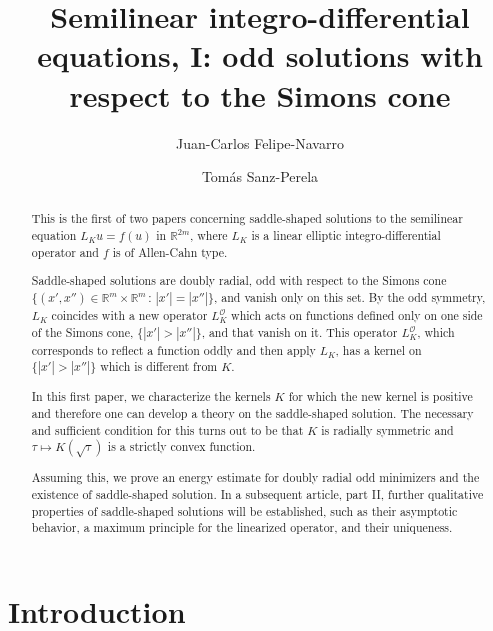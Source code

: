 \documentclass[12pt,reqno]{amsart}
\title[Semilinear integro-differential equations I]{Semilinear integro-differential equations, I: odd solutions with respect to the Simons cone}
\author{Juan-Carlos Felipe-Navarro}
\author{Tomás Sanz-Perela}
\theoremstyle{definition}
\theoremstyle{remark}
\newcommand{\con}[1]{\mathbb{#1}}
\newcommand{\R}{\con{R}} %
\newcommand{\ocal}{\mathcal{O}}
\numberwithin{equation}{section}
\begin{document}
\begin{abstract}
This is the first of two papers concerning saddle-shaped solutions to the semilinear equation $L_K u = f(u)$ in $\R^{2m}$, where $L_K$ is a linear elliptic integro-differential operator and $f$ is of Allen-Cahn type. 

Saddle-shaped solutions are doubly radial, odd with respect to the Simons cone $\{(x', x'') \in \R^m \times \R^m \, : \, |x'| = |x''|\}$, and vanish only on this set. By the odd symmetry, $L_K$ coincides with a new operator $L_K^\ocal$ which acts on functions defined only on one side of the Simons cone, $\{|x'|>|x''|\}$, and that vanish on it. This operator $L_K^\ocal$, which corresponds to reflect a function oddly and then apply $L_K$, has a kernel on $\{|x'|>|x''|\}$ which is different from $K$. 

In this first paper, we characterize the kernels $K$ for which the new kernel is positive and therefore one can develop a theory on the saddle-shaped solution. The necessary and sufficient condition for this turns out to be that $K$ is radially symmetric and $\tau\mapsto K(\sqrt \tau)$ is a strictly convex function. 

Assuming this, we prove an energy estimate for doubly radial odd minimizers and the existence of saddle-shaped solution. In a subsequent article, part II, further qualitative properties of saddle-shaped solutions will be established, such as their asymptotic behavior, a maximum principle for the linearized operator, and their uniqueness.
\end{abstract}


\maketitle

\tableofcontents

\section{Introduction}
\label{Sec:Introduction}
\end{document}
